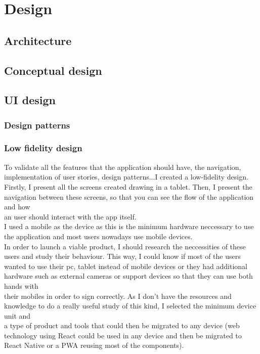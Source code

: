 \chapter{Design}

\section{Architecture}

\section{Conceptual design}

\section{UI design}
\subsection{Design patterns}
\subsection{Low fidelity design}
To validate all the features that the application should have, the navigation, implementation of user stories, design patterns...I created a low-fidelity design. \\

Firstly, I present all the screens created drawing in a tablet. Then, I present the navigation between these screens, so that you can see the flow of the application and how \\
an user should interact with the app itself. \\

I used a mobile as the device as this is the minimum hardware neccessary to use the application and most users nowadays use mobile devices. \\
In order to launch a viable product, I should research the neccessities of these users and study their behaviour. This way, I could know if most of the users \\
wanted to use their pc, tablet instead of mobile devices or they had additional hardware such as external cameras or support devices so that they can use both hands with \\
their mobiles in order to sign correctly. As I don't have the resources and knowledge to do a really useful study of this kind, I selected the minimum device unit and \\
a type of product and tools that could then be migrated to any device (web technology using React could be used in any device and then be migrated to React Native or a PWA reusing most of the components).\\
